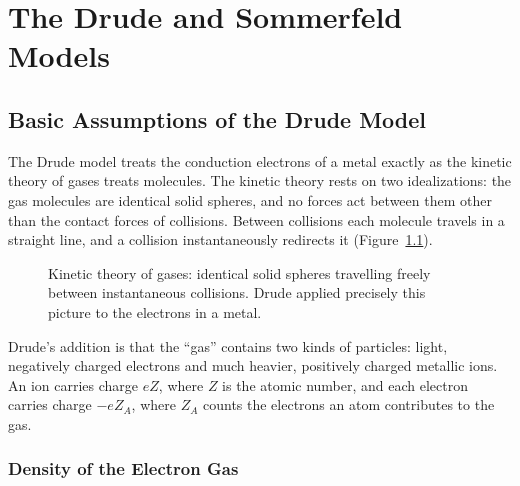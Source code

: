 \chapter{The Drude and Sommerfeld Models}

\section{Basic Assumptions of the Drude Model}

The Drude model treats the conduction electrons of a metal exactly as the kinetic theory of gases treats molecules. The kinetic theory rests on two idealizations: the gas molecules are identical solid spheres, and no forces act between them other than the contact forces of collisions. Between collisions each molecule travels in a straight line, and a collision instantaneously redirects it (Figure~\ref{fig:drude-kinetic}).

\begin{figure}[ht]
    \centering
    \caption{Kinetic theory of gases: identical solid spheres travelling freely between instantaneous collisions. Drude applied precisely this picture to the electrons in a metal.}
    \label{fig:drude-kinetic}
\end{figure}

Drude's addition is that the ``gas'' contains two kinds of particles: light, negatively charged electrons and much heavier, positively charged metallic ions. An ion carries charge $eZ$, where $Z$ is the atomic number, and each electron carries charge $-eZ_A$, where $Z_A$ counts the electrons an atom contributes to the gas.

\subsection{Density of the Electron Gas}

